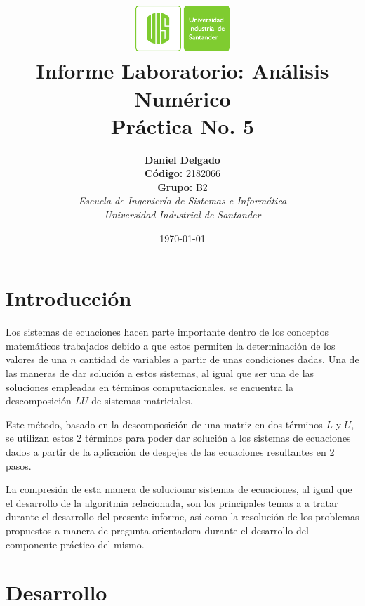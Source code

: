 \documentclass[english,notitlepage,letterpaper, 10pt]{article} %
\newcommand{\university}{\normalsize Universidad Industrial de Santander}
\newcommand{\faculty}{\normalsize  Escuela de Ingenier\'ia de Sistemas e Inform\'atica}
\newcommand{\codigo}{\normalsize  2182066}
\newcommand{\grupo}{\normalsize  B2}
\begin{document}
\title{	\vspace{-12mm}\includegraphics[width=0.2\linewidth]{Logos/UIS.pdf}\\Informe Laboratorio: An\'alisis Num\'erico\\  \centering Pr\'actica No. 5}
\author{
  \textbf{Daniel Delgado} \\ \textbf{C\'odigo:} \codigo\\
  \textbf{Grupo:} \grupo\\
  \textit{\faculty}\\
  \textit{\university}}
\date{\today}
\maketitle

\section{Introducci\'on}
Los sistemas de ecuaciones hacen parte importante dentro de los conceptos matemáticos trabajados debido a que estos permiten la determinación de los valores de una $n$ cantidad de variables a partir de unas condiciones dadas. Una de las maneras de dar solución a estos sistemas, al igual que ser una de las soluciones empleadas en términos computacionales, se encuentra la descomposición $LU$ de sistemas matriciales.

Este método, basado en la descomposición de una matriz en dos términos $L$ y $U$, se utilizan estos 2 términos para poder dar solución a los sistemas de ecuaciones dados a partir de la aplicación de despejes de las ecuaciones resultantes en 2 pasos.

La compresión de esta manera de solucionar sistemas de ecuaciones, al igual que el desarrollo de la algoritmia relacionada, son los principales temas a a tratar durante el desarrollo del presente informe, así como la resolución de los problemas propuestos a manera de pregunta orientadora durante el desarrollo del componente práctico del mismo.

\section{Desarrollo}
\end{document}
